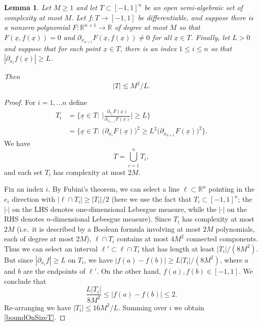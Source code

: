 \documentclass[letterpaper, reqno,11pt]{article}
\numberwithin{equation}{section}
\newcommand{\RR}{\mathbb{R}}
\numberwithin{thm}{section}
\newtheorem{lem}[thm]{Lemma}
\theoremstyle{remark}
\begin{document}
\begin{lem}\label{smallSetBigDerivative}
Let $M\geq 1$ and let $T\subset[-1,1]^n$ be an open semi-algebraic set of complexity at most $M$. Let $f\colon T\to[-1,1]$ be differentiable, and suppose there is a nonzero polynomial $F\colon\RR^{n+1}\to\RR$ of degree at most $M$ so that $F(\underline x, f(\underline x))=0$ and $\partial_{x_{n+1}}F(\underline x, f(\underline x))\neq 0$ for all $\underline x \in T$. Finally, let $L>0$ and suppose that for each point $\underline x \in T$, there is an index $1\leq i\leq n$ so that $|\partial_{x_i}f(\underline x)|\geq L$. 

Then
\begin{equation}\label{boundOnSizeT}
|T|\lesssim  M^2/L.
\end{equation}
\end{lem}
\begin{proof}


For $i=1,\ldots n$ define
\begin{align*}
T_i &= \Big\{\underline x\in T\colon \ \Big|\frac{\partial_{x_i} F(\underline x)}{\partial_{x_{n+1}} F(\underline x)}\Big|\geq L\Big\}\\
&=\Big\{\underline x\in T\colon\ \big(\partial_{x_i} F(\underline x)\big)^2 \geq L^2\big(\partial_{x_{n+1}} F(\underline x)\big)^2\Big\}.
\end{align*}
We have
\begin{equation}\label{mostOfTCoveredByTi}
T =  \bigcup_{i=1}^n T_i,
\end{equation}
and each set $T_i$ has complexity at most $2M.$ 

Fix an index $i$. By Fubini's theorem, we can select a line $\ell\subset\RR^n$ pointing in the $e_i$ direction with $|\ell\cap T_i|\geq |T_i|/2$ (here we use the fact that $T_i\subset[-1,1]^n$; the $|\cdot|$ on the LHS denotes one-dimensional Lebesgue measure, while the $|\cdot|$ on the RHS denotes $n$-dimensional Lebesgue measure). Since $T_i$ has complexity at most $2M$ (i.e.~it is described by a Boolean formula involving at most $2M$ polynomials, each of degree at most $2M$), $\ell\cap T_i$ contains at most $4M^2$ connected components. Thus we can select an interval $\ell'\subset \ell\cap T_i$ that has length at least $|T_i|/(8M^2)$. But since $|\partial_{x_i}f|\geq L$ on $T_i$, we have $|f(a)-f(b)|\geq L|T_i|/(8M^2)$, where $a$ and $b$ are the endpoints of $\ell'$. On the other hand, $f(a),f(b)\in[-1,1]$. We conclude that
\[
\frac{L|T_i|}{8M^2}\leq |f(a)-f(b)|\leq 2.
\]
Re-arranging we have $|T_i|\leq 16M^2/L$. Summing over $i$ we obtain \eqref{boundOnSizeT}. 
\end{proof}
\end{document}
